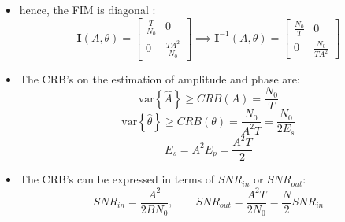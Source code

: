 \begin{itemize}
\[= A\sqrt{\frac{T}{2}} \cos(\theta),
\qquad
E\{ \mathbf{s}^T \mathbf{X} \}
= -A\sqrt{\frac{T}{2}} \sin(\theta)
\]
    \[
\begin{aligned}
\frac{\partial^2 \ln L(A, \theta)}{\partial \theta^2} &=
- \frac{2A}{N_0 \sqrt{2B}} \sum_{i=0}^{N-1} x_i \cos(2\pi F_0 i + \theta)
\\[2ex]
&= - \frac{2A}{N_0 \sqrt{2B}}
\left[
\sum_{i=0}^{N-1} x_i \cos(2\pi F_0 i) \cos(\theta)
- \sum_{i=0}^{N-1} x_i \sin(2\pi F_0 i) \sin(\theta)
\right]\\[2ex]
&= - \frac{2A}{N_0 \sqrt{2B}} \sqrt{\frac{N}{2}}
\left[
\mathbf{c}^T \mathbf{X} \cos(\theta)
- \mathbf{s}^T \mathbf{X} \sin(\theta)
\right]\\[2ex]
I_{22} &= -E\left\{ \frac{\partial^2 \ln L(A, \theta)}{\partial \theta^2} \right\}
= \frac{2A}{N_0 \sqrt{2B}} \sqrt{\frac{N}{2}}
\left[
E \{ \mathbf{c}^T \mathbf{X} \} \cos(\theta)
- E \{ \mathbf{s}^T \mathbf{X} \} \sin(\theta)
\right]\\[2ex]
&= \frac{2A}{N_0 \sqrt{2B}} \sqrt{\frac{N}{2}}
\left[
A \sqrt{\frac{T}{2}} \cos(\theta) \cos(\theta)
+ A \sqrt{\frac{T}{2}} \sin(\theta) \sin(\theta)
\right] = \frac{2A}{N_0 \sqrt{2B}} \sqrt{\frac{N}{2}} A \sqrt{\frac{T}{2}}\\[2ex]
&= \frac{2A^2}{N_0 \sqrt{2B}} \sqrt{\frac{BT}{2}} \sqrt{\frac{T}{2}}
= \frac{A^2 T}{N_0}
\end{aligned}
\]
    \item hence, the FIM is diagonal :
    \[
\mathbf{I}(A, \theta) = 
\begin{bmatrix}
\frac{T}{N_0} & 0 \\
0 & \frac{T A^2}{N_0}
\end{bmatrix}
\implies
\mathbf{I}^{-1}(A, \theta) = 
\begin{bmatrix}
\frac{N_0}{T} & 0 \\
0 & \frac{N_0}{T A^2}
\end{bmatrix}
\]
    \item The CRB's on the estimation of amplitude and phase are:
    \[
\text{var}\left\{\hat{A}\right\} \geq CRB(A) = \frac{N_0}{T}
\]
\[
\text{var}\left\{\hat{\theta}\right\} \geq CRB(\theta) = \frac{N_0}{A^2 T} = \frac{N_0}{2 E_s}
\]
\[
E_s = A^2 E_p = \frac{A^2 T}{2}
\]
    \item The CRB's can be expressed in terms of \(SNR_{in}\) or \(SNR_{out}\):
    \[
SNR_{in} = \frac{A^2}{2 B N_0}, \qquad
SNR_{out} = \frac{A^2 T}{2 N_0} = \frac{N}{2} SNR_{in}
\]


\end{itemize}
